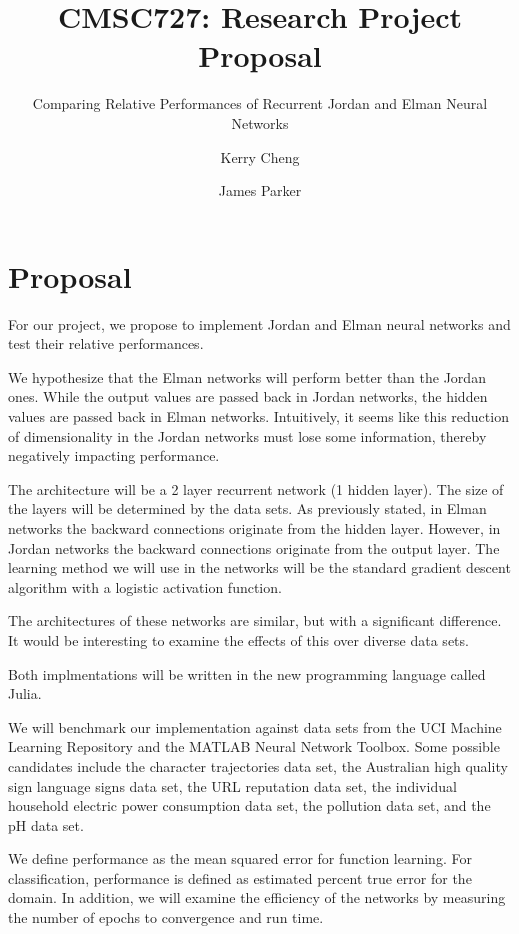 \documentclass[12pt]{article}
\title{CMSC727: Research Project Proposal}
\subtitle{Comparing Relative Performances of Recurrent Jordan and Elman Neural Networks}
\author{Kerry Cheng \and James Parker}
\begin{document}
\maketitle

\section{Proposal}

For our project, we propose to implement Jordan and Elman neural networks and test their relative performances.

We hypothesize that the Elman networks will perform better than the Jordan ones.
While the output values are passed back in Jordan networks, the hidden values are passed back in Elman networks.
Intuitively, it seems like this reduction of dimensionality in the Jordan networks must lose some information, thereby negatively impacting performance.

The architecture will be a 2 layer recurrent network (1 hidden layer). The size of the layers will be determined by the data sets.
As previously stated, in Elman networks the backward connections originate from the hidden layer.
However, in Jordan networks the backward connections originate from the output layer.
The learning method we will use in the networks will be the standard gradient descent algorithm with a logistic activation function.

The architectures of these networks are similar, but with a significant difference. It would be interesting to examine the effects of this over diverse data sets.

Both implmentations will be written in the new programming language called Julia.

We will benchmark our implementation against data sets from the UCI Machine Learning Repository and the MATLAB Neural Network Toolbox. Some possible candidates include the character trajectories data set, 
the Australian high quality sign language signs data set, 
the URL reputation data set, 
the individual household electric power consumption data set, 
the pollution data set, 
and the pH data set.

We define performance as the mean squared error for function learning.
For classification, performance is defined as estimated percent true error for the domain.
In addition, we will examine the efficiency of the networks by measuring the number of epochs to convergence and run time.
\end{document}
